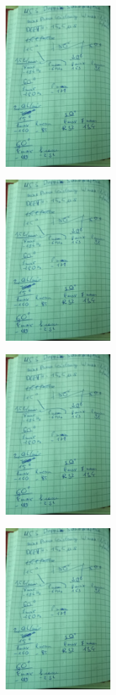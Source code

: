 \begin{minipage}[t]{0.4\textwidth}
   \includegraphics[height=6cm, page=1]{Abbildungen/us3_messdaten.pdf}
\end{minipage}
\begin{minipage}[t]{0.4\textwidth}
   \includegraphics[height=6cm, keepaspectratio, page=2]{Abbildungen/us3_messdaten.pdf}
\end{minipage}
\begin{minipage}[t]{0.4\textwidth}
    \includegraphics[height=6cm, page=3]{Abbildungen/us3_messdaten.pdf}
 \end{minipage}
 \begin{minipage}[t]{0.4\textwidth}
    \includegraphics[height=6cm, keepaspectratio, page=4]{Abbildungen/us3_messdaten.pdf}
 \end{minipage}

